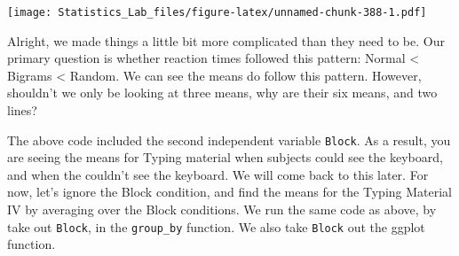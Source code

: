 \documentclass[
]{book}
\newenvironment{Shaded}{\begin{snugshade}}{\end{snugshade}}
\newcommand{\AttributeTok}[1]{\textcolor[rgb]{0.77,0.63,0.00}{#1}}
\newcommand{\CommentTok}[1]{\textcolor[rgb]{0.56,0.35,0.01}{\textit{#1}}}
\newcommand{\DecValTok}[1]{\textcolor[rgb]{0.00,0.00,0.81}{#1}}
\newcommand{\DocumentationTok}[1]{\textcolor[rgb]{0.56,0.35,0.01}{\textbf{\textit{#1}}}}
\newcommand{\FunctionTok}[1]{\textcolor[rgb]{0.00,0.00,0.00}{#1}}
\newcommand{\NormalTok}[1]{#1}
\newcommand{\OtherTok}[1]{\textcolor[rgb]{0.56,0.35,0.01}{#1}}
\newcommand{\SpecialCharTok}[1]{\textcolor[rgb]{0.00,0.00,0.00}{#1}}
\newcommand{\StringTok}[1]{\textcolor[rgb]{0.31,0.60,0.02}{#1}}
\begin{document}
\begin{Shaded}
\end{Shaded}

\texttt{[image: Statistics\_Lab\_files/figure-latex/unnamed-chunk-388-1.pdf]}

Alright, we made things a little bit more complicated than they need to be. Our primary question is whether reaction times followed this pattern: Normal \textless{} Bigrams \textless{} Random. We can see the means do follow this pattern. However, shouldn't we only be looking at three means, why are their six means, and two lines?

The above code included the second independent variable \texttt{Block}. As a result, you are seeing the means for Typing material when subjects could see the keyboard, and when the couldn't see the keyboard. We will come back to this later. For now, let's ignore the Block condition, and find the means for the Typing Material IV by averaging over the Block conditions. We run the same code as above, by take out \texttt{Block}, in the \texttt{group\_by} function. We also take \texttt{Block} out the ggplot function.
\end{document}

